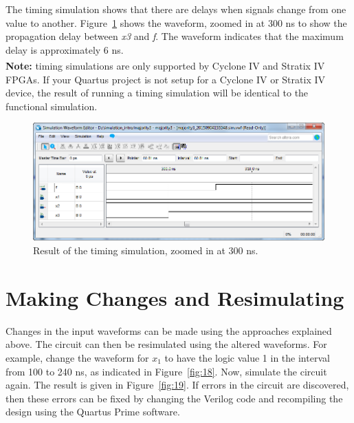 \documentclass[11pt, twoside, pdftex]{article}
\begin{document}
The timing simulation shows that there are delays when signals change from one value to another. 
Figure~\ref{fig:21} shows the waveform, zoomed in at 300 ns to show the propagation delay 
between {\it x3} and {\it f}. The waveform indicates that the maximum delay is approximately 6 ns. 
~\\

{\bf Note:} timing simulations are only supported by Cyclone IV\textsuperscript{\textregistered} and Stratix IV\textsuperscript{\textregistered} FPGAs.
If your Quartus project is not setup for a Cyclone IV or Stratix IV device, the result of running a timing simulation will be identical to the functional simulation.

\begin{figure}[H]
   \begin{center}
      \includegraphics[scale=0.65]{figures/figure21.png}
   \caption{Result of the timing simulation, zoomed in at 300 ns.} 
	 \label{fig:21}
	 \end{center}
\end{figure}

\section{Making Changes and Resimulating}

Changes in the input waveforms can be made using the approaches explained above. The circuit
can then be resimulated using the altered waveforms. For example, change the
waveform for $x_1$ to have the logic value 1 in the interval from 100 to 240 ns, as indicated
in Figure~\ref{fig:18}. Now, simulate the circuit again. The result is 
given in Figure~\ref{fig:19}. If errors in the circuit are discovered, then these errors can be fixed by
changing the Verilog code and recompiling the design using the Quartus Prime software.
~\\
\end{document}
